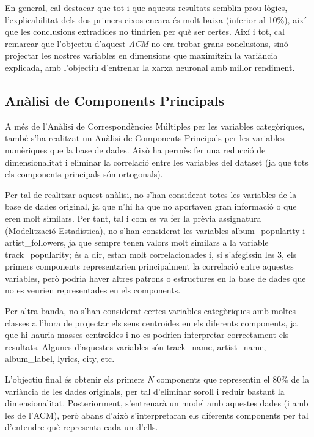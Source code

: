 En general, cal destacar que tot i que aquests resultats semblin prou lògics, l'explicabilitat dels dos primers eixos encara és molt baixa (inferior al 10\%), així que les conclusions extradides no tindrien per què ser certes. Així i tot, cal remarcar que l'objectiu d'aquest \textit{ACM} no era trobar grans conclusions, sinó projectar les nostres variables en dimensions que maximitzin la variància explicada, amb l'objectiu d'entrenar la xarxa neuronal amb millor rendiment.   

\subsection{Anàlisi de Components Principals}
A més de l'Anàlisi de Correspondències Múltiples per les variables categòriques, també s'ha realitzat un Anàlisi de Components Principals per les variables numèriques que la base de dades. Això ha permès fer una reducció de dimensionalitat i eliminar la correlació entre les variables del dataset (ja que tots els components principals són ortogonals).

Per tal de realitzar aquest anàlisi, no s'han considerat totes les variables de la base de dades original, ja que n'hi ha que no aportaven gran informació o que eren molt similars. Per tant, tal i com es va fer la prèvia assignatura (Modelització Estadística),  no s'han considerat les variables album\_popularity i artist\_followers, ja que sempre tenen valors molt similars a la variable track\_popularity; és a dir, estan molt correlacionades i, si s'afegissin les 3, els primers components representarien principalment la correlació entre aquestes variables, però podria haver altres patrons o estructures en la base de dades que no es veurien representades en els components.

Per altra banda, no s'han considerat certes variables categòriques amb moltes classes a l'hora de projectar els seus centroides en els diferents components, ja que hi hauria masses centroides i no es podrien interpretar correctament els resultats. Algunes d'aquestes variables són track\_name, artist\_name, album\_label, lyrics, city, etc.

L'objectiu final és obtenir els primers \textit{N} components que representin el 80\% de la variància de les dades originals, per tal d'eliminar soroll i reduir bastant la dimensionalitat. Posteriorment, s'entrenarà un model amb aquestes dades (i amb les de l'ACM), però abans d'això s'interpretaran els diferents components per tal d'entendre què representa cada un d'ells.

